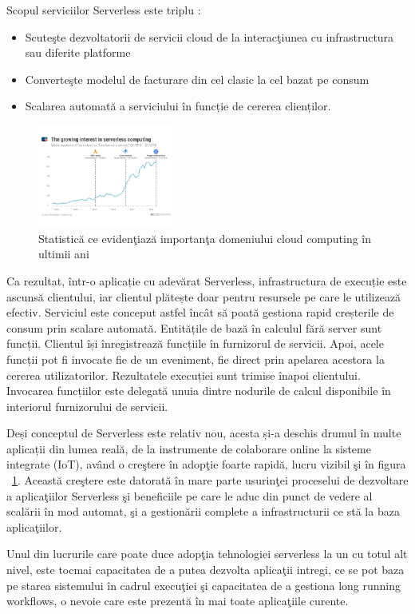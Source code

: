 Scopul serviciilor Serverless este triplu : 
\begin{itemize}
\item Scuteşte dezvoltatorii de servicii cloud de la interacţiunea cu infrastructura sau diferite platforme
\item Converteşte modelul de facturare din cel clasic la cel bazat pe consum
\item Scalarea automată a serviciului în funcție de cererea clienților.
\end{itemize}
\par

\begin{figure}
	  \begin{center}
        \includegraphics[width=0.4\textwidth]{images/grafic_serverless_computing}
       \caption{Statistică ce evidenţiază importanţa domeniului cloud computing în ultimii ani}
			\label{fig:cloud_computing_graph}
    \end{center}
\end{figure}
Ca rezultat, într-o aplicație cu adevărat Serverless, infrastructura de execuție este ascunsă clientului, iar clientul plătește doar pentru resursele pe care le utilizează efectiv. Serviciul este conceput astfel încât să poată gestiona rapid creșterile de consum prin scalare automată. Entitățile de bază în calculul fără server sunt funcții. Clientul își înregistrează funcțiile în furnizorul de servicii. Apoi, acele funcții pot fi invocate fie de un eveniment, fie direct prin apelarea acestora la cererea utilizatorilor. Rezultatele execuției sunt trimise înapoi clientului. Invocarea funcțiilor este delegată unuia dintre nodurile de calcul disponibile în interiorul furnizorului de servicii.

\par
Deși conceptul de Serverless este relativ nou, acesta și-a deschis drumul în multe aplicații din lumea reală, de la instrumente de colaborare online la sisteme integrate (IoT), având o creştere în adopţie foarte rapidă, lucru vizibil şi în figura ~\ref{fig:cloud_computing_graph}. Această creştere este datorată în mare parte usurinţei proceselui de dezvoltare a aplicaţiilor Serverless şi beneficiile pe care le aduc din punct de vedere al scalării în mod automat, şi a gestionării complete a infrastructurii ce stă la baza aplicaţiilor. 
\par
Unul din lucrurile care poate duce adopţia tehnologiei serverless la un cu totul alt nivel, este tocmai capacitatea de a putea dezvolta aplicaţii intregi, ce se pot baza pe starea sistemului în cadrul execuţiei şi capacitatea de a gestiona long running workflows, o nevoie care este prezentă în mai toate aplicaţiile curente. 
